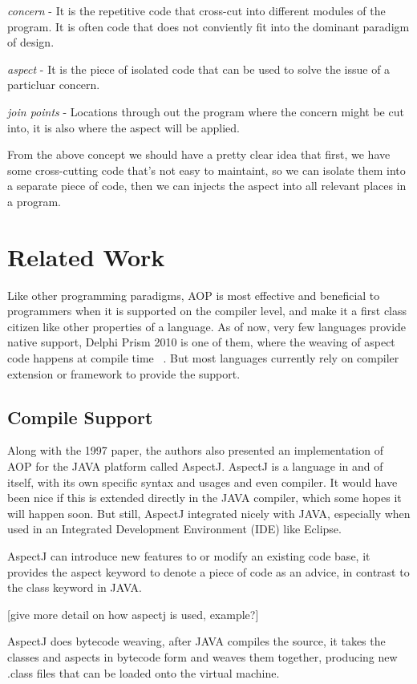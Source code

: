 {\em concern} - It is the repetitive code that cross-cut into different modules of the program. It is often code that does not conviently fit into the dominant paradigm of design.

{\em aspect} - It is the piece of isolated code that can be used to solve the issue of a particluar concern.

{\em join points} - Locations through out the program where the concern might be cut into, it is also where the aspect will be applied.

From the above concept we should have a pretty clear idea that first, we have some cross-cutting code that's not easy to maintaint, so we can isolate them into a separate piece of code, then we can injects the aspect into all relevant places in a program.

\section{Related Work}Like other programming paradigms, AOP is most effective and beneficial to programmers when it is supported on the compiler level, and make it a first class citizen like other properties of a language. As of now, very few languages provide native support, Delphi Prism 2010 is one of them, where the weaving of aspect code happens at compile time ~\cite{delphi_prism2010}. But most languages currently rely on compiler extension or framework to provide the support.

\subsection{Compile Support}

Along with the 1997 paper, the authors also presented an implementation of AOP for the JAVA platform called AspectJ. AspectJ is a language in and of itself, with its own specific syntax and usages and even compiler. It would have been nice if this is extended directly in the JAVA compiler, which some hopes it will happen soon. But still, AspectJ integrated nicely with JAVA, especially when used in an Integrated Development Environment (IDE) like Eclipse.

AspectJ can introduce new features to or modify an existing code base, it provides the aspect keyword to denote a piece of code as an advice, in contrast to the class keyword in JAVA.

[give more detail on how aspectj is used, example?]

AspectJ does bytecode weaving, after JAVA compiles the source, it takes the classes and aspects in bytecode form and weaves them together, producing new .class files that can be loaded onto the virtual machine.

